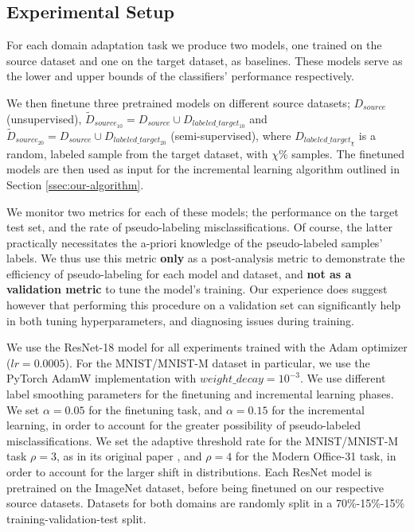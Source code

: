 \documentclass{article}
\begin{document}
	
	\subsection{Experimental Setup}
	
	For each domain adaptation task we produce two models, one trained on the source dataset and one on the target dataset, as baselines. These models serve as the lower and upper bounds of the classifiers' performance respectively.
	
	We then finetune three pretrained models on different source datasets; $D_{source}$ (unsupervised), $\tilde{D}_{source_{10}} = D_{source} \cup D_{labeled\_target_{10}}$ and $\tilde{D}_{source_{20}} = D_{source} \cup D_{labeled\_target_{20}}$ (semi-supervised), where $D_{labeled\_target_{\chi}}$ is a random, labeled sample from the target dataset, with $\chi\%$ samples. The finetuned models are then used as input for the incremental learning algorithm outlined in Section \ref{ssec:our-algorithm}.
	
	We monitor two metrics for each of these models; the performance on the target test set, and the rate of pseudo-labeling misclassifications. Of course, the latter practically necessitates the a-priori knowledge of the pseudo-labeled samples' labels. We thus use this metric \textbf{only} as a post-analysis metric to demonstrate the efficiency of pseudo-labeling for each model and dataset, and \textbf{not as a validation metric} to tune the model's training. Our experience does suggest however that performing this procedure on a validation set can significantly help in both tuning hyperparameters, and diagnosing issues during training.
	
	We use the ResNet-18 \cite{resnet} model for all experiments trained with the Adam optimizer ($lr=0.0005$). For the MNIST/MNIST-M dataset in particular, we use the PyTorch AdamW implementation with $weight\_decay = 10^{-3}$. We use different label smoothing parameters for the finetuning and incremental learning phases. We set $\alpha = 0.05$ for the finetuning task, and $\alpha = 0.15$ for the incremental learning, in order to account for the greater possibility of pseudo-labeled misclassifications. We set the adaptive threshold rate for the MNIST/MNIST-M task $\rho = 3$, as in its original paper \cite{ican}, and $\rho=4$ for the Modern Office-31 task, in order to account for the larger shift in distributions. Each ResNet model is pretrained on the ImageNet \cite{imagenet} dataset, before being finetuned on our respective source datasets. Datasets for both domains are randomly split in a 70\%-15\%-15\% training-validation-test split.
	
\end{document}
